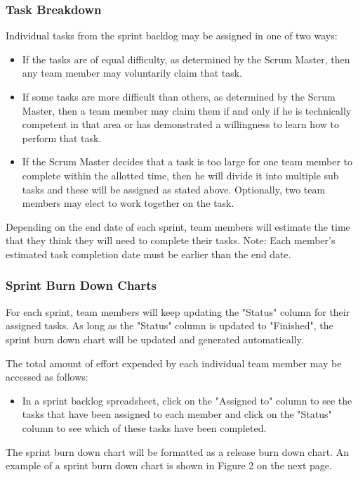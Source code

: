 \subsubsection{Task Breakdown}
Individual tasks from the sprint backlog may be assigned in one of two ways: 
\begin{itemize}

\item If the tasks are of equal difficulty, as determined by the Scrum Master, then any team member may voluntarily claim that task.

\item If some tasks are more difficult than others, as determined by the Scrum Master, then a team member may claim them if and only if he is technically competent in that area or has demonstrated a willingness to learn how to perform that task. 

\item If the Scrum Master decides that a task is too large for one team member to complete within the allotted time, then he will divide it into multiple sub tasks and these will be assigned as stated above. Optionally, two team members may elect to work together on the task. 

\end{itemize}
Depending on the end date of each sprint, team members will estimate the time that they think they will need to complete their tasks. Note: Each member's estimated task completion date must be earlier than the end date. 

\subsubsection{Sprint Burn Down Charts}
For each sprint, team members will keep updating the "Status" column for their assigned tasks. As long as the "Status" column is updated to "Finished", the sprint burn down chart will be updated and generated automatically. 

The total amount of effort expended by each individual team member may be accessed as follows:

\begin{itemize}
    
\item In a sprint backlog spreadsheet, click on the "Assigned to" column to see the tasks that have been assigned to each member and click on the "Status" column to see which of these tasks have been completed. 

\end{itemize}
The sprint burn down chart will be formatted as a release burn down chart.
An example of a sprint burn down chart is shown in Figure 2 on the next page.


